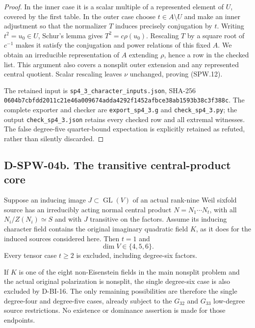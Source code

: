 \begin{proof}
In the inner case it is a scalar multiple of a represented
element of $U$, covered by the first table.  In the outer case
choose $t\in A\setminus U$ and make an inner adjustment so
that the normalizer $T$ induces precisely conjugation by $t$.
Writing $t^2=u_0\in U$, Schur's lemma gives
$T^2=c\rho(u_0)$.  Rescaling $T$ by a square root of
$c^{-1}$ makes it satisfy the conjugation and power relations
of this fixed $A$.  We obtain an irreducible representation
of $A$ extending $\rho$, hence a row in the checked list.
This argument also covers a nonsplit outer extension and any
represented central quotient.  Scalar rescaling leaves $\nu$
unchanged, proving (SPW.12).

The retained input is \texttt{sp4\_3\_character\_inputs.json},
SHA-256
\texttt{0604b7cbfdd2011c21e46a009674adda4292f1452afbce38ab1593b38c3f388c}.
The complete exporter and checker are
\texttt{export\_sp4\_3.g} and \texttt{check\_sp4\_3.py};
the output \texttt{check\_sp4\_3.json} retains every checked
row and all extremal witnesses.  The false degree-five
quarter-bound expectation is explicitly retained as refuted,
rather than silently discarded.
\end{proof}

\subsection*{D-SPW-04b. The transitive central-product core}

\begin{theorem}
\label{D-SPW-04b}
Suppose an inducing image $J\subset\operatorname{GL}(V)$
of an actual rank-nine Weil sixfold source has an irreducibly
acting normal central product $N=N_1\cdots N_t$, with all
$N_i/Z(N_i)\simeq S$ and with $J$ transitive on the factors.
Assume its inducing character field contains the original
imaginary quadratic field $K$, as it does for the induced
sources considered here.  Then $t=1$ and
\[
                          \dim V\in\{4,5,6\}.             \tag{SPW.15}
\]
Every tensor case $t\ge2$ is excluded, including degree-six
factors.

If $K$ is one of the eight non-Eisenstein fields in the main
nonsplit problem and the actual original polarization is
nonsplit, the single degree-six case is also excluded by
D-BI-16.  The only remaining possibilities are therefore the
single degree-four and degree-five cases, already subject to
the $G_{32}$ and $G_{33}$ low-degree source restrictions.
No existence or dominance assertion is made for those endpoints.
\end{theorem}


